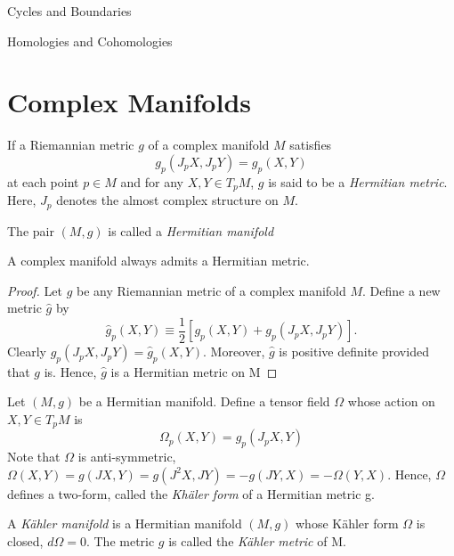 \begin{subsubsection}{Cycles and Boundaries}
\begin{subsubsection}{Homologies and Cohomologies}
\begin{theorem}
\end{theorem}

\section{Complex Manifolds}
\begin{definition}
If a Riemannian metric $g$ of a complex manifold $M$ satisfies 
\begin{equation}
g_p(J_pX, J_pY) = g_p(X,Y)
\end{equation}
at each point $p\in M$ and for any $X,Y\in T_p M$, $g$ is said to be a \textit{Hermitian metric}. Here, $J_p$ denotes the almost complex structure on $M$.
\end{definition}

\begin{definition}
The pair $(M,g)$ is called a \textit{Hermitian manifold}
\end{definition}

\begin{theorem}
A complex manifold always admits a Hermitian metric.
\end{theorem}

\begin{proof}
Let $g$ be any Riemannian metric of a complex manifold $M$. Define a new metric $\hat{g}$ by
\begin{equation}
\hat{g}_p(X,Y)\equiv \frac{1}{2}\left[g_p(X,Y) + g_p(J_pX, J_pY)\right].
\end{equation}
Clearly $\hat{g}_p(J_pX,J_pY) = \hat{g}_p(X,Y)$. Moreover, $\hat{g}$ is positive definite provided that $g$ is. Hence, $\hat{g}$ is a Hermitian metric on M
\end{proof}

\begin{definition}
  Let $(M,g)$ be a Hermitian manifold. Define a tensor field $\Omega$ whose
  action on $X,Y\in T_pM$ is
\begin{equation}
\Omega_p(X,Y) = g_p(J_pX,Y)
\end{equation}
Note that $\Omega$ is anti-symmetric, $\Omega(X,Y) = g(JX,Y) = g(J^2X,JY)
= -g(JY,X) = -\Omega(Y,X)$. Hence, $\Omega$ defines a two-form, called the
\textit{Kh\"aler form} of a Hermitian metric g.
\end{definition}

\begin{definition}
  A \textit{K\"ahler manifold} is a Hermitian manifold $(M,g)$ whose K\"ahler
  form $\Omega$ is closed, $d\Omega=0$. The metric $g$ is called the
  \textit{K\"ahler metric} of M.
\end{definition}


\end{subsubsection}
\end{subsubsection}
